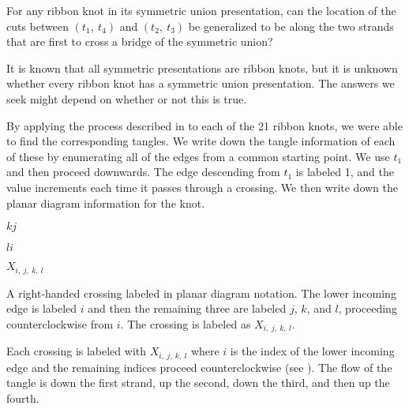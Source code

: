 \begin{paper}
{For any ribbon knot in its symmetric union presentation, can the location of
the cuts between $(t_1,~t_4)$ and $(t_2,~t_3)$ be generalized to be along the
two strands that are first to cross a bridge of the symmetric union?}

It is known that all symmetric presentations are ribbon knots, but it is unknown
whether every ribbon knot has a symmetric union presentation.
The answers we seek might depend on whether or not this is true.


By applying the process described in \thmRibbon to each of the 21 ribbon knots,
we were able to find the corresponding tangles.
We write down the tangle information of each of these by enumerating all of the
edges from a common starting point.
We use $t_1$ and then proceed downwards.
The edge descending from $t_1$ is labeled 1, and the value increments each time
it passes through a crossing.
We then write down the planar diagram information for the knot.\\

{\hspace{0.3in}\hspace{0.275\columnwidth}$k$\hspace{0.2\columnwidth}$j$
\vspace{-0.5em}\begin{center}\end{center}
\vspace{-0.5em}
\hspace{0.3in}\hspace{0.275\columnwidth}$l$\hspace{0.2\columnwidth}$i$

\hspace{0.3in}\hspace{0.31\columnwidth}$X_{i,~j,~k,~l}$}
{A right-handed crossing labeled in planar diagram notation.
The lower incoming edge is labeled $i$ and then the remaining three are
labeled $j$, $k$, and $l$, proceeding counterclockwise from $i$.
The crossing is labeled as $X_{i,~j,~k,~l}$.}

Each crossing is labeled with $X_{i,~j,~k,~l}$ where $i$ is the index of the
lower incoming edge and the remaining indices proceed counterclockwise (see
\figCrossing).
The flow of the tangle is down the first strand, up the second, down the third,
and then up the fourth.\\


\end{paper}
